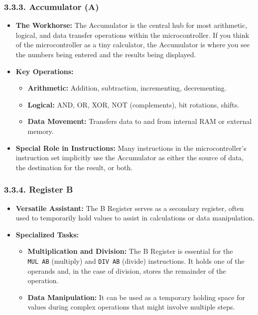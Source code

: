 \documentclass[
]{article}
\begin{document}
\hypertarget{333-accumulator-a}{%
\subsubsection{3.3.3. Accumulator (A)}\label{333-accumulator-a}}

\begin{itemize}
\item
  \textbf{The Workhorse:} The Accumulator is the central hub for most
  arithmetic, logical, and data transfer operations within the
  microcontroller. If you think of the microcontroller as a tiny
  calculator, the Accumulator is where you see the numbers being entered
  and the results being displayed.
\item
  \textbf{Key Operations:}

  \begin{itemize}
  \item
    \textbf{Arithmetic:} Addition, subtraction, incrementing,
    decrementing.
  \item
    \textbf{Logical:} AND, OR, XOR, NOT (complements), bit rotations,
    shifts.
  \item
    \textbf{Data Movement:} Transfers data to and from internal RAM or
    external memory.
  \end{itemize}
\item
  \textbf{Special Role in Instructions:} Many instructions in the
  microcontroller's instruction set implicitly use the Accumulator as
  either the source of data, the destination for the result, or both.
\end{itemize}

\hypertarget{334-register-b}{%
\subsubsection{3.3.4. Register B}\label{334-register-b}}

\begin{itemize}
\item
  \textbf{Versatile Assistant:} The B Register serves as a secondary
  register, often used to temporarily hold values to assist in
  calculations or data manipulation.
\item
  \textbf{Specialized Tasks:}

  \begin{itemize}
  \item
    \textbf{Multiplication and Division:} The B Register is essential
    for the \texttt{MUL\ AB} (multiply) and \texttt{DIV\ AB} (divide)
    instructions. It holds one of the operands and, in the case of
    division, stores the remainder of the operation.
  \item
    \textbf{Data Manipulation:} It can be used as a temporary holding
    space for values during complex operations that might involve
    multiple steps.
  \end{itemize}
\end{itemize}
\end{document}
